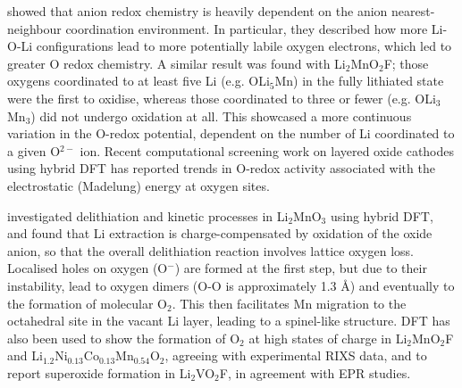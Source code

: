\documentclass[../main.tex]{subfiles}
\begin{document}
\citeauthor{Seo2016} showed that anion redox chemistry is heavily dependent on the anion nearest-neighbour coordination environment.\cite{Seo2016} In particular, they described how more Li-O-Li configurations lead to more potentially labile oxygen electrons, which led to greater O redox chemistry. A similar result was found with Li$_2$MnO$_2$F; those oxygens coordinated to at least five Li (e.g. OLi$_5$Mn) in the fully lithiated state were the first to oxidise, whereas those coordinated to three or fewer (e.g. OLi$_3$Mn$_3$) did not undergo oxidation at all. This showcased a more continuous variation in the O-redox potential, dependent on the number of Li coordinated to a given O$^{2-}$ ion.\cite{Sharpe2020} Recent computational screening work on layered oxide cathodes using hybrid DFT has reported trends in O-redox activity associated with the electrostatic (Madelung) energy at oxygen sites.\cite{Davies2020}

\citeauthor{Chen2016} investigated delithiation and kinetic processes in Li$_2$MnO$_3$ using hybrid DFT, and found that Li extraction is charge-compensated by oxidation of the oxide anion, so that the overall delithiation reaction involves lattice oxygen loss.\cite{Chen2016} Localised holes on oxygen (O$^-$) are formed at the first step, but due to their instability, lead to oxygen dimers (O-O is approximately 1.3 \AA) and eventually to the formation of molecular O$_2$. This then facilitates Mn migration to the octahedral site in the vacant Li layer, leading to a spinel-like structure. DFT has also been used to show the formation of O$_2$ at high states of charge in Li$_2$MnO$_2$F\cite{Sharpe2020} and Li$_{1.2}$Ni$_{0.13}$Co$_{0.13}$Mn$_{0.54}$O$_2$, \cite{House2020a} agreeing with experimental RIXS data, and to report superoxide formation in Li$_2$VO$_2$F, in agreement with EPR studies.\cite{Chang2020}
\end{document}

